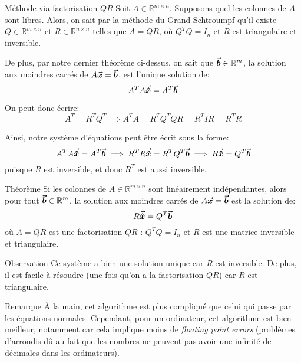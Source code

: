 \documentclass[a4paper]{article}
\begin{document}
\begin{parag}{Méthode via factorisation $QR$}
    Soit $A \in \mathbb{R}^{m \times n}$. Supposons quel les colonnes de $A$ sont libres. Alors, on sait par la méthode du Grand Schtroumpf qu'il existe $Q \in \mathbb{R}^{m \times n}$ et $R \in \mathbb{R}^{n \times n}$ telles que $A = QR$, où $Q^T Q = I_n$ et $R$ est triangulaire et inversible.

    De plus, par notre dernier théorème ci-dessus, on sait que $\bm{\protect\vec{b}} \in \mathbb{R}^m$, la solution aux moindres carrés de $A \bm{\protect\vec{x}} = \bm{\protect\vec{b}}$, est l'unique solution de:
    \[A^T A \bm{\protect\vec{\hat{x}}} = A^T \bm{\protect\vec{b}}\]

    On peut donc écrire:
    \[A^T = R^T Q^T \implies A^{T} A = R^T Q^T Q R = R^T I R = R^T R\]

    Ainsi, notre système d'équations peut être écrit sous la forme:
    \[A^T A \bm{\protect\vec{\hat{x}}} = A^T \bm{\protect\vec{b}} \implies R^T R \bm{\protect\vec{\hat{x}}} = R^T Q^T \bm{\protect\vec{b}} \implies R \bm{\protect\vec{\hat{x}}} = Q^T \bm{\protect\vec{b}}\]
    puisque $R$ est inversible, et donc $R^T$ est aussi inversible.
\end{parag}

\begin{parag}{Théorème}
    Si les colonnes de $A \in \mathbb{R}^{m \times n}$ sont linéairement indépendantes, alors pour tout $\bm{\protect\vec{b}} \in \mathbb{R}^m$, la solution aux moindres carrés de $A \bm{\protect\vec{x}} = \bm{\protect\vec{b}}$ est la solution de:
    \[R \bm{\protect\vec{\hat{x}}} = Q^T \bm{\protect\vec{b}}\]
    où $A = QR$ est une factorisation $QR$ : $Q^T Q = I_n$ et $R$ est une matrice inversible et triangulaire.

    \begin{subparag}{Observation}
        Ce système a bien une solution unique car $R$ est inversible. De plus, il est facile à résoudre (une fois qu'on a la factorisation $QR$) car $R$ est triangulaire.
    \end{subparag}

    \begin{subparag}{Remarque}
        À la main, cet algorithme est plus compliqué que celui qui passe par les équations normales. Cependant, pour un ordinateur, cet algorithme est bien meilleur, notamment car cela implique moins de \textit{floating point errors} (problèmes d'arrondis dû au fait que les nombres ne peuvent pas avoir une infinité de décimales dans les ordinateurs).
    \end{subparag}
\end{parag}
\end{document}
